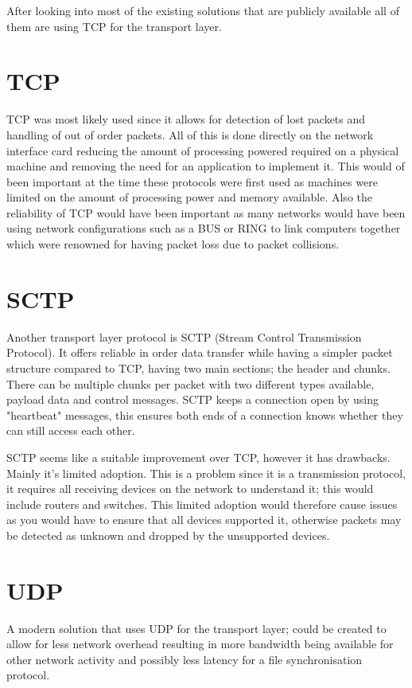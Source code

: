 After looking into most of the existing solutions that are publicly available all of them are using TCP for the transport layer.

\section{TCP}
TCP was most likely used since it allows for detection of lost packets and handling of out of order packets. All of this is done directly on the network interface card reducing the amount of processing powered required on a physical machine and removing the need for an application to implement it. This would of been important at the time these protocols were first used as machines were limited on the amount of processing power and memory available. Also the reliability of TCP would have been important as many networks would have been using network configurations such as a BUS or RING to link computers together which were renowned for having packet loss due to packet collisions.

\section{SCTP}
Another transport layer protocol is SCTP (Stream Control Transmission Protocol). It offers reliable in order data transfer while having a simpler packet structure compared to TCP, having two main sections; the header and chunks. There can be multiple chunks per packet with two different types available, payload data and control messages. SCTP keeps a connection open by using "heartbeat" messages, this ensures both ends of a connection knows whether they can still access each other.

SCTP seems like a suitable improvement over TCP, however it has drawbacks. Mainly it's limited adoption. This is a problem since it is a transmission protocol, it requires all receiving devices on the network to understand it; this would include routers and switches. This limited adoption would therefore cause issues as you would have to ensure that all devices supported it, otherwise packets may be detected as unknown and dropped by the unsupported devices.

\section{UDP}
A modern solution that uses UDP for the transport layer; could be created to allow for less network overhead resulting in more bandwidth being available for other network activity and possibly less latency for a file synchronisation protocol.

